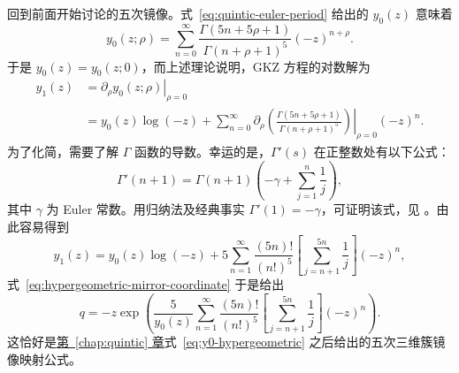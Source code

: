 \begingroup
{}
\renewcommand{\theHexam}{6.3.4.continued.\arabic{exam}}
\begin{example}[续]\label{ex:quintic-frobenius-continued}
回到前面开始讨论的五次镜像。式~\eqref{eq:quintic-euler-period} 给出的 $y_0(z)$ 意味着
\begin{equation}\label{eq:quintic-gamma-frobenius}
y_0(z;\rho)=\sum_{n=0}^\infty
\frac{\Gamma(5n+5\rho+1)}{\Gamma(n+\rho+1)^5}(-z)^{n+\rho}.
\end{equation}
于是 $y_0(z)=y_0(z;0)$，而上述理论说明，GKZ 方程的对数解为
\[
\begin{aligned}
y_1(z)&=\left.\partial_\rho y_0(z;\rho)\right|_{\rho=0}\\
&=y_0(z)\log(-z)+
\sum_{n=0}^\infty
\left.\partial_\rho\left(\frac{\Gamma(5n+5\rho+1)}
{\Gamma(n+\rho+1)^5}\right)\right|_{\rho=0}(-z)^n.
\end{aligned}
\]
为了化简，需要了解 $\Gamma$ 函数的导数。幸运的是，$\Gamma'(s)$ 在正整数处有以下公式：
\[
\Gamma'(n+1)=\Gamma(n+1)\left(-\gamma+\sum_{j=1}^n\frac1j\right),
\]
其中 $\gamma$ 为 Euler 常数。用归纳法及经典事实 $\Gamma'(1)=-\gamma$，可证明该式，见 。由此容易得到
\[
y_1(z)=y_0(z)\log(-z)+5\sum_{n=1}^\infty
\frac{(5n)!}{(n!)^5}\left[\sum_{j=n+1}^{5n}\frac1j\right](-z)^n,
\]
式~\eqref{eq:hypergeometric-mirror-coordinate} 于是给出
\[
q=-z\exp\left(\frac5{y_0(z)}\sum_{n=1}^\infty
\frac{(5n)!}{(n!)^5}\left[\sum_{j=n+1}^{5n}\frac1j\right](-z)^n\right).
\]
这恰好是\hyperref[chap:quintic]{第~\ref*{chap:quintic} 章}式~\eqref{eq:y0-hypergeometric} 之后给出的五次三维簇镜像映射公式。


\end{example}
